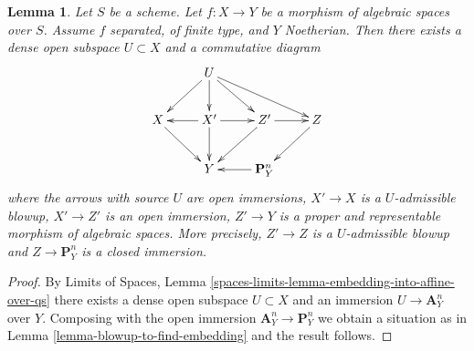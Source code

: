 \documentclass[10pt,a4paper]{amsart}
\theoremstyle{plain}
\newtheorem{lemma}[subsection]{Lemma}
\theoremstyle{definition}
\theoremstyle{remark}
\numberwithin{equation}{subsection}
\begin{document}
\begin{lemma}
\label{lemma-chow-noetherian}
Let $S$ be a scheme. Let $f : X \to Y$ be a morphism of algebraic spaces
over $S$. Assume $f$ separated, of finite type, and $Y$ Noetherian.
Then there exists a dense open subspace $U \subset X$ and
a commutative diagram
$$
\xymatrix{
& U \ar[ld] \ar[d] \ar[rd] \ar[rrd] \\
X \ar[rd] & X' \ar[l] \ar[d] \ar[r] & Z' \ar[ld] \ar[r] & Z \ar[ld] \\
& Y & \mathbf{P}^n_Y \ar[l]
}
$$
where
the arrows with source $U$ are open immersions,
$X' \to X$ is a $U$-admissible blowup,
$X' \to Z'$ is an open immersion,
$Z' \to Y$ is a proper and representable morphism of algebraic spaces.
More precisely, $Z' \to Z$ is a $U$-admissible blowup
and $Z \to \mathbf{P}^n_Y$ is a closed immersion.
\end{lemma}

\begin{proof}
By Limits of Spaces, Lemma
\ref{spaces-limits-lemma-embedding-into-affine-over-qs}
there exists a dense open subspace $U \subset X$ and an immersion
$U \to \mathbf{A}^n_Y$ over $Y$. Composing with the open immersion
$\mathbf{A}^n_Y \to \mathbf{P}^n_Y$ we obtain a situation as in
Lemma \ref{lemma-blowup-to-find-embedding} and the result
follows.
\end{proof}
\end{document}
